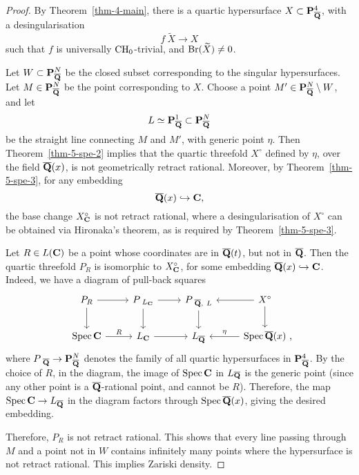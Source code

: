 \begin{proof}
    By Theorem~\ref{thm-4-main}, there is a quartic hypersurface $X \subset \bbP^4_{\bbQbar}$,
    with a desingularisation
    \[ f \: \widetilde{X} \to X \]
    such that $f$ is universally $\mathrm{CH}_0$-trivial, and $\mathrm{Br} (\widetilde{X}) \neq 0$.

    Let $W \subset \bbP^N_{\bbQbar}$ be the closed subset corresponding to
    the singular hypersurfaces.
    Let $M \in \bbP^N_{\bbQbar}$ be the point corresponding to $X$.
    Choose a point $M' \in \bbP^N_{\bbQbar} \setminus W$,
    and let
    \[ L \simeq \bbP^1_{\bbQbar} \subset \bbP^N_{\bbQbar} \]
    be the straight line connecting $M$ and $M'$, with generic point $\eta$.
    Then Theorem~\ref{thm-5-spe-2} implies that the quartic threefold $X^\circ$ defined by $\eta$,
    over the field $\bbQbar(x)$, is not geometrically retract rational.
    Moreover, by Theorem~\ref{thm-5-spe-3}, for any embedding
    \[ \bbQbar(x) \hookrightarrow \bbC, \]
    the base change $X^\circ_{\bbC}$ is not retract rational,
    where a desingularisation of $X^\circ$ can be obtained via Hironaka's theorem,
    as is required by Theorem~\ref{thm-5-spe-3}. 

    Let $R \in L(\bbC)$ be a point whose coordinates are in $\bbQbar(t)$, but not in $\bbQbar$.
    Then the quartic threefold $P_R$ is isomorphic to $X^\circ_{\bbC}$,
    for some embedding $\bbQbar(x) \hookrightarrow \bbC$.
    Indeed, we have a diagram of pull-back squares
    \[ \begin{tikzcd}
        P_R \ar[d] \ar[r] &
        P_{\ L_{\bbC}} \ar[d] \ar[r] &
        P_{\ \bbQbar,\ L} \ar[d] &
        X^\circ \ar[d] \ar[l] \\
        \Spec \bbC \ar[r, "R"] &
        L_{\bbC} \ar[r] &
        L_{\bbQbar} &
        \Spec \bbQbar (x) \rlap{\ ,} \ar[l, "\eta"']
    \end{tikzcd} \]
    where $P_{\ \bbQbar} \to \bbP^N_{\bbQbar}$ denotes the family of all quartic hypersurfaces in $\bbP^4_{\bbQbar}$.
    By the choice of $R$, in the diagram, the image of $\Spec \bbC$ in $L_{\smash{\bbQbar}}$ is the generic point 
    (since any other point is a $\bbQbar$-rational point, and cannot be $R$).
    Therefore, the map $\Spec \bbC \to L_{\bbQbar}$ in the diagram factors through $\Spec \bbQbar(x)$,
    giving the desired embedding.

    Therefore, $P_R$ is not retract rational.
    This shows that every line passing through $M$ and a point not in $W$
    contains infinitely many points where the hypersurface is not retract rational.
    This implies Zariski density.
\end{proof}

